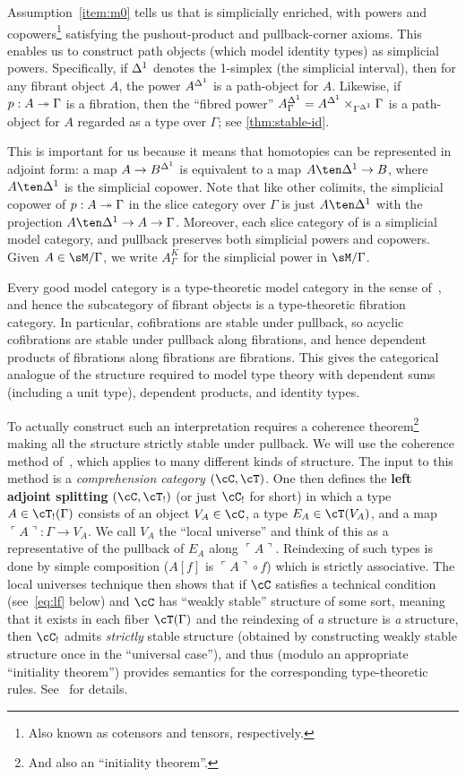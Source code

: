 \documentclass{amsart}
\def\name#1{\ulcorner #1\urcorner}
\let\C\cC
\let\T\cT
\begin{document}
Assumption~\ref{item:m0} tells us that \sM is simplicially enriched, with powers and copowers\footnote{Also known as cotensors and tensors, respectively.} satisfying the pushout-product and pullback-corner axioms.
This enables us to construct path objects (which model identity types) as simplicial powers.
Specifically, if ${\Delta^1}$ denotes the 1-simplex (the simplicial interval), then for any fibrant object $A$, the power $A^{\Delta^1}$ is a path-object for $A$.
Likewise, if $p:A\twoheadrightarrow \Gamma$ is a fibration, then the ``fibred power'' $A^{\Delta^1}_\Gamma = A^{\Delta^1} \times_{\Gamma^{\Delta^1}} \Gamma$ is a path-object for $A$ regarded as a type over $\Gamma$; see \cref{thm:stable-id}.

This is important for us because it means that homotopies can be represented in adjoint form: a map $A\to B^{\Delta^1}$ is equivalent to a map $A\ten \ivl \to B$, where $A\ten \ivl$ is the simplicial copower.
Note that like other colimits, the simplicial copower of $p:A\twoheadrightarrow \Gamma$ in the slice category over $\Gamma$ is just $A\ten\ivl$ with the projection $A\ten\ivl \to A \to \Gamma$.
Moreover, each slice category of \sM is a simplicial model category, and pullback preserves both simplicial powers and copowers.
Given $A\in\sM/\Gamma$, we write $A^K_\Gamma$ for the simplicial power in $\sM/\Gamma$.

Every good model category is a type-theoretic model category in the sense of~\cite{shulman:invdia}, and hence the subcategory of fibrant objects is a type-theoretic fibration category.
In particular, cofibrations are stable under pullback, so acyclic cofibrations are stable under pullback along fibrations, and hence dependent products of fibrations along fibrations are fibrations.
This gives the categorical analogue of the structure required to model type theory with dependent sums (including a unit type), dependent products, and identity types.

To actually construct such an interpretation requires a coherence theorem\footnote{And also an ``initiality theorem''.} making all the structure strictly stable under pullback.
We will use the coherence method of~\cite{lw:localuniv}, which applies to many different kinds of structure.
The input to this method is a \emph{comprehension category} $(\C,\T)$.
One then defines the \textbf{left adjoint splitting} $(\C,\T_!)$ (or just $\C_!$ for short) in which a type $A\in \T_!(\Gamma)$ consists of an object $V_A\in\C$, a type $E_A\in\T(V_A)$, and a map $\name{A}:\Gamma\to V_A$.
We call $V_A$ the ``local universe'' and think of this as a representative of the pullback of $E_A$ along $\name{A}$.
Reindexing of such types is done by simple composition ($A[f]$ is $\name{A}\circ f$) which is strictly associative.
The local universes technique then shows that if $\C$ satisfies a technical condition (see~\eqref{eq:lf} below) and $\C$ has ``weakly stable'' structure of some sort, meaning that it exists in each fiber $\T(\Gamma)$ and the reindexing of \emph{a} structure is \emph{a} structure, then $\C_!$ admits \emph{strictly} stable structure (obtained by constructing weakly stable structure once in the ``universal case''), and thus (modulo an appropriate ``initiality theorem'') provides semantics for the corresponding type-theoretic rules.
See~\cite{lw:localuniv} for details.
\end{document}
